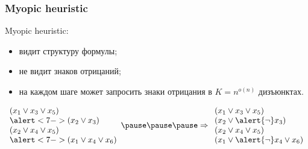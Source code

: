 \begin{frame}
	\frametitle{Myopic heuristic}
    \pause
    
    \begin{definition}
        Myopic heuristic:
        \pause
        \begin{itemize}
	        \item видит структуру формулы;
        	\pause
        	\item не видит знаков отрицаний;
        	\item<6-> на каждом шаге может запросить знаки отрицания в
        		$K = n^{o(n)}$ дизъюнктах.
        \end{itemize}
    \end{definition}

    \pause
    $\begin{array}{l}
        (x_1 \vee x_3 \vee x_5) \\
        \alert<7->{(x_2 \vee x_3)} \\
        (x_2 \vee x_4 \vee x_5) \\
        \alert<7->{(x_1 \vee x_4 \vee x_6)} \\
    \end{array}
    \pause
    \pause
    \pause
    \Rightarrow
    \begin{array}{l}
        (x_1 \vee x_3 \vee x_5) \\
        (x_2 \vee \alert{\neg} x_3) \\
        (x_2 \vee x_4 \vee x_5) \\
        (x_1 \vee \alert{\neg} x_4 \vee x_6) \\
    \end{array}$
    
\end{frame}

